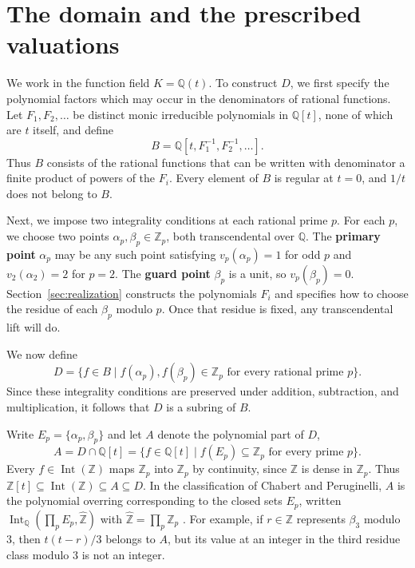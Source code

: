\documentclass{article}
\theoremstyle{remark}
\begin{document}
\section{The domain and the prescribed valuations}

We work in the function field $K = \mathbb{Q}(t)$.
To construct $D$, we first specify the polynomial factors which may occur in the denominators of rational functions.
Let $F_1, F_2, \ldots$ be distinct monic irreducible polynomials in $\mathbb{Q}[t]$, none of which are $t$ itself, and define
\[
    B = \mathbb{Q}[t, F_1^{-1}, F_2^{-1}, \ldots].
\]
Thus $B$ consists of the rational functions that can be written with denominator a finite product of powers of the $F_i$.
Every element of $B$ is regular at $t = 0$, and $1/t$ does not belong to $B$.

Next, we impose two integrality conditions at each rational prime $p$.
For each $p$, we choose two points $\alpha_p, \beta_p \in \mathbb{Z}_p$, both transcendental over $\mathbb{Q}$.
The \textbf{primary point} $\alpha_p$ may be any such point satisfying $v_p(\alpha_p) = 1$ for odd $p$ and $v_2(\alpha_2) = 2$ for $p = 2$.
The \textbf{guard point} $\beta_p$ is a unit, so $v_p(\beta_p) = 0$.
Section~\ref{sec:realization} constructs the polynomials $F_i$ and specifies how to choose the residue of each $\beta_p$ modulo $p$.
Once that residue is fixed, any transcendental lift will do.

We now define
\[
    D = \{ f \in B \mid f(\alpha_p), f(\beta_p) \in \mathbb{Z}_p
                        \text{ for every rational prime } p \}.
\]
Since these integrality conditions are preserved under addition, subtraction, and multiplication, it follows that $D$ is a subring of $B$.

Write $E_p = \{\alpha_p, \beta_p\}$ and let $A$ denote the polynomial part of $D$,
\[
    A = D \cap \mathbb{Q}[t]
      = \{ f \in \mathbb{Q}[t] \mid f(E_p) \subseteq \mathbb{Z}_p \text{ for every prime } p \}.
\]
Every $f \in \operatorname{Int}(\mathbb{Z})$ maps $\mathbb{Z}_p$ into $\mathbb{Z}_p$ by continuity, since $\mathbb{Z}$ is dense in $\mathbb{Z}_p$.
Thus $\mathbb{Z}[t] \subseteq \operatorname{Int}(\mathbb{Z}) \subseteq A \subseteq D$.
In the classification of Chabert and Peruginelli, $A$ is the polynomial overring corresponding to the closed sets $E_p$, written $\operatorname{Int}_{\mathbb{Q}}(\prod_p E_p, \widehat{\mathbb{Z}})$ with $\widehat{\mathbb{Z}} = \prod_p \mathbb{Z}_p$ \cite[Theorem~6.2]{CPOverrings}.
For example, if $r \in \mathbb{Z}$ represents $\beta_3$ modulo $3$, then $t(t-r)/3$ belongs to $A$, but its value at an integer in the third residue class modulo $3$ is not an integer.
\end{document}
